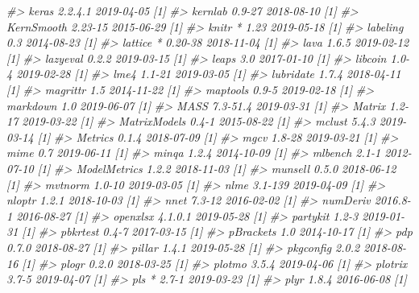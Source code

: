 \documentclass[]{krantz}
\makeatletter
\newenvironment{Shaded}{\begin{snugshade}}{\end{snugshade}}
\newcommand{\CommentTok}[1]{\textcolor[rgb]{0.37,0.37,0.37}{\textit{#1}}}
\newenvironment{kframe}{%
\medskip{}
\setlength{\fboxsep}{.8em}
 \def\at@end@of@kframe{}%
 \ifinner\ifhmode%
  \def\at@end@of@kframe{\end{minipage}}%
  \begin{minipage}{\columnwidth}%
 \fi\fi%
 \def\FrameCommand##1{\hskip\@totalleftmargin \hskip-\fboxsep
 \colorbox{shadecolor}{##1}\hskip-\fboxsep
     \hskip-\linewidth \hskip-\@totalleftmargin \hskip\columnwidth}%
 \MakeFramed {\advance\hsize-\width
   \@totalleftmargin\z@ \linewidth\hsize
   \@setminipage}}%
 {\par\unskip\endMakeFramed%
 \at@end@of@kframe}
\renewenvironment{Shaded}{\begin{kframe}}{\end{kframe}}
\makeatother
\begin{document}
\begin{Shaded}
\begin{Highlighting}[]
\CommentTok{#>    keras           2.2.4.1    2019-04-05 [1]}
\CommentTok{#>    kernlab         0.9-27     2018-08-10 [1]}
\CommentTok{#>    KernSmooth      2.23-15    2015-06-29 [1]}
\CommentTok{#>    knitr         * 1.23       2019-05-18 [1]}
\CommentTok{#>    labeling        0.3        2014-08-23 [1]}
\CommentTok{#>    lattice       * 0.20-38    2018-11-04 [1]}
\CommentTok{#>    lava            1.6.5      2019-02-12 [1]}
\CommentTok{#>    lazyeval        0.2.2      2019-03-15 [1]}
\CommentTok{#>    leaps           3.0        2017-01-10 [1]}
\CommentTok{#>    libcoin         1.0-4      2019-02-28 [1]}
\CommentTok{#>    lme4            1.1-21     2019-03-05 [1]}
\CommentTok{#>    lubridate       1.7.4      2018-04-11 [1]}
\CommentTok{#>    magrittr        1.5        2014-11-22 [1]}
\CommentTok{#>    maptools        0.9-5      2019-02-18 [1]}
\CommentTok{#>    markdown        1.0        2019-06-07 [1]}
\CommentTok{#>    MASS            7.3-51.4   2019-03-31 [1]}
\CommentTok{#>    Matrix          1.2-17     2019-03-22 [1]}
\CommentTok{#>    MatrixModels    0.4-1      2015-08-22 [1]}
\CommentTok{#>    mclust          5.4.3      2019-03-14 [1]}
\CommentTok{#>    Metrics         0.1.4      2018-07-09 [1]}
\CommentTok{#>    mgcv            1.8-28     2019-03-21 [1]}
\CommentTok{#>    mime            0.7        2019-06-11 [1]}
\CommentTok{#>    minqa           1.2.4      2014-10-09 [1]}
\CommentTok{#>    mlbench         2.1-1      2012-07-10 [1]}
\CommentTok{#>    ModelMetrics    1.2.2      2018-11-03 [1]}
\CommentTok{#>    munsell         0.5.0      2018-06-12 [1]}
\CommentTok{#>    mvtnorm         1.0-10     2019-03-05 [1]}
\CommentTok{#>    nlme            3.1-139    2019-04-09 [1]}
\CommentTok{#>    nloptr          1.2.1      2018-10-03 [1]}
\CommentTok{#>    nnet            7.3-12     2016-02-02 [1]}
\CommentTok{#>    numDeriv        2016.8-1   2016-08-27 [1]}
\CommentTok{#>    openxlsx        4.1.0.1    2019-05-28 [1]}
\CommentTok{#>    partykit        1.2-3      2019-01-31 [1]}
\CommentTok{#>    pbkrtest        0.4-7      2017-03-15 [1]}
\CommentTok{#>    pBrackets       1.0        2014-10-17 [1]}
\CommentTok{#>    pdp             0.7.0      2018-08-27 [1]}
\CommentTok{#>    pillar          1.4.1      2019-05-28 [1]}
\CommentTok{#>    pkgconfig       2.0.2      2018-08-16 [1]}
\CommentTok{#>    plogr           0.2.0      2018-03-25 [1]}
\CommentTok{#>    plotmo          3.5.4      2019-04-06 [1]}
\CommentTok{#>    plotrix         3.7-5      2019-04-07 [1]}
\CommentTok{#>    pls           * 2.7-1      2019-03-23 [1]}
\CommentTok{#>    plyr            1.8.4      2016-06-08 [1]}

\end{Highlighting}
\end{Shaded}
\end{document}
